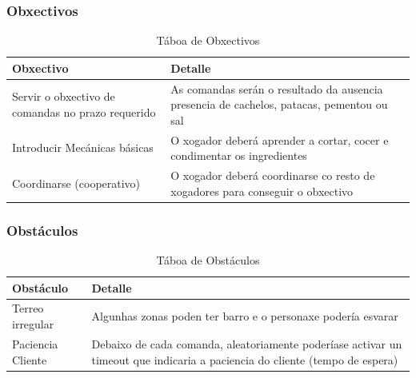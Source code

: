 \documentclass{report}  %
\begin{document}
\subsubsection{Obxectivos}


\begin{table}[h]
    \centering
    \renewcommand{\arraystretch}{1.3} %
    \setlength{\tabcolsep}{10pt} %
    \label{tab:obxectivos}
    \begin{tabular}{|p{4cm}|p{9cm}|}
        \hline
        \rowcolor{octopus} %
        \textbf{Obxectivo}  & \textbf{Detalle} \\
        \hline
        Servir o obxectivo de comandas no prazo requerido & As comandas serán o resultado da ausencia presencia de cachelos, patacas, pementou ou sal \\
        \hline
        Introducir Mecánicas básicas & O xogador deberá aprender a cortar, cocer e condimentar os ingredientes \\
        \hline
        Coordinarse (cooperativo) & O xogador deberá coordinarse co resto de xogadores para conseguir o obxectivo \\
        \hline
    \end{tabular}
    \caption{Táboa de Obxectivos}
\end{table}

\subsubsection{Obstáculos}

\begin{table}[h]
    \centering
    \renewcommand{\arraystretch}{1.3} %
    \setlength{\tabcolsep}{10pt} %
    \label{tab:obstaculos}
    \begin{tabular}{|p{4cm}|p{9cm}|}
        \hline
        \rowcolor{octopus} %
        \textbf{Obstáculo}  & \textbf{Detalle} \\
        \hline
        Terreo irregular & Algunhas zonas poden ter barro e o personaxe podería esvarar \\
        \hline
        Paciencia Cliente & Debaixo de cada comanda, aleatoriamente poderíase activar un timeout que indicaria a paciencia do cliente (tempo de espera) \\
        \hline
    \end{tabular}
    \caption{Táboa de Obstáculos}
\end{table}
\end{document}
